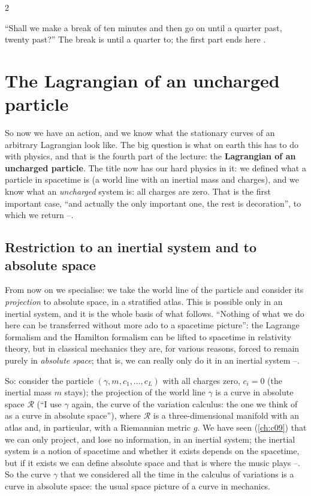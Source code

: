 \begin{paracol}{2}
\begin{coursenote}\label{cn:var-break}
``Shall we make a break of ten minutes and then go on until a quarter past, twenty past?'' The break is until a quarter to; the first part ends here .
\end{coursenote}

\section{The Lagrangian of an uncharged particle}\label{sec:var-free}

So now we have an action, and we know what the stationary curves of an arbitrary Lagrangian look like. The big question is what on earth this has to do with physics, and that is the fourth part of the lecture: the \textbf{Lagrangian of an uncharged particle}. The title now has our hard physics in it: we defined what a particle in spacetime is (a world line with an inertial mass and charges), and we know what an \emph{uncharged} system is: all charges are zero. That is the first important case, ``and actually the only important one, the rest is decoration'', to which we return --.

\subsection{Restriction to an inertial system and to absolute space}\label{ssec:var-restrict}

From now on we specialise: we take the world line of the particle and consider its \emph{projection} to absolute space, in a stratified atlas. This is possible only in an inertial system, and it is the whole basis of what follows. ``Nothing of what we do here can be transferred without more ado to a spacetime picture'': the Lagrange formalism and the Hamilton formalism can be lifted to spacetime in relativity theory, but in classical mechanics they are, for various reasons, forced to remain purely in \emph{absolute space}; that is, we can really only do it in an inertial system --.

So: consider the particle $(\gamma,m,c_1,\dots,c_L)$ with all charges zero, $c_i=0$ (the inertial mass $m$ stays); the projection of the world line $\gamma$ is a curve in absolute space $\mathcal R$ (``I use $\gamma$ again, the curve of the variation calculus: the one we think of as a curve in absolute space''), where $\mathcal R$ is a three-dimensional manifold with an atlas and, in particular, with a Riemannian metric $g$. We have seen (\cref{ch:c09}) that we can only project, and lose no information, in an inertial system; the inertial system is a notion of spacetime and whether it exists depends on the spacetime, but if it exists we can define absolute space and that is where the music plays --. So the curve $\gamma$ that we considered all the time in the calculus of variations is a curve in absolute space: the usual space picture of a curve in mechanics.


\end{paracol}
